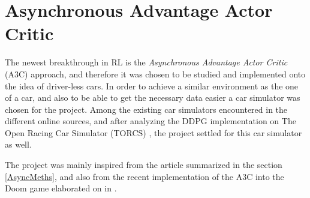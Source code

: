 \section{Asynchronous Advantage Actor Critic}
\label{sec:A3C}
The newest breakthrough in RL is the \textit{Asynchronous Advantage Actor Critic} (A3C) approach, and therefore it was chosen to be studied and implemented onto the idea of driver-less cars. In order to achieve a similar environment as the one of a car, and also to be able to get the necessary data easier a car simulator was chosen for the project. Among the existing car simulators encountered in the different online sources, and after analyzing the DDPG implementation on The Open Racing Car Simulator (TORCS) \cite{DDPG_Torcs}, the project settled for this car simulator as well.

The project was mainly inspired from the article \cite{DBLP:journals/corr/MnihBMGLHSK16} summarized in the section \ref{AsyncMeths}, and also from the recent implementation of the A3C into the Doom game elaborated on in \cite{A3CDoom}.

